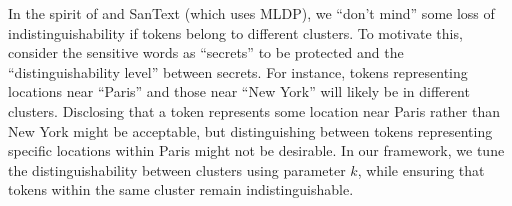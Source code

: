 In the  spirit of \cite{chatzikokolakis2013broadening} and SanText (which uses MLDP), we ``don’t mind'' some loss of indistinguishability if tokens belong to different clusters. To motivate this, consider the sensitive words as ``secrets'' to be protected and the ``distinguishability level'' between secrets. For instance, tokens representing locations near ``Paris''  and those near ``New York'' will likely be in different clusters. Disclosing that a token represents some location near Paris rather than  New York might be acceptable, but distinguishing between tokens representing specific locations within Paris might not be desirable. 
In our framework, we tune the distinguishability between clusters using parameter $k$, while ensuring that tokens within the same cluster remain indistinguishable.





